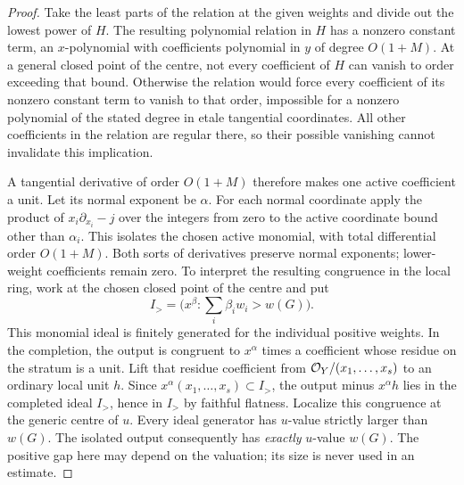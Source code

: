 \begin{proof}
Take the least parts of the relation at the given weights and divide
out the lowest power of \(H\). The resulting polynomial relation in
\(H\) has a nonzero constant term, an \(x\)-polynomial with coefficients
polynomial in \(y\) of degree \(O(1+M)\). At a general closed point of
the centre, not every coefficient of \(H\) can vanish to order exceeding
that bound. Otherwise the relation would force every coefficient of
its nonzero constant term to vanish to that order, impossible for a
nonzero polynomial of the stated degree in etale tangential coordinates.
All other coefficients in the relation are regular there, so their
possible vanishing cannot invalidate this implication.

A tangential derivative of order \(O(1+M)\) therefore makes one active
coefficient a unit. Let its normal exponent be \(\alpha\). For each
normal coordinate apply the product of
\(x_i\partial_{x_i}-j\) over the integers from zero to the active
coordinate bound other than \(\alpha_i\).
This isolates the chosen active monomial, with total differential order
\(O(1+M)\). Both sorts of derivatives preserve normal exponents;
lower-weight coefficients remain zero. To interpret the resulting
congruence in the local ring, work at the chosen closed point of the
centre and put
\[
 I_{>}=\bigl(x^\beta:\textstyle\sum_i\beta_iw_i>w(G)\bigr).
\]
This monomial ideal is finitely generated for the individual positive
weights. In the completion, the output is congruent to \(x^\alpha\)
times a coefficient whose residue on the stratum is a unit. Lift that
residue coefficient from \(\mathcal O_Y/(x_1,\ldots,x_s)\) to an ordinary
local unit \(h\). Since \(x^\alpha(x_1,\ldots,x_s)\subset I_{>}\),
the output minus \(x^\alpha h\) lies in the completed ideal
\(I_{>}\), hence in \(I_{>}\) by faithful flatness. Localize this
congruence at the generic centre of \(u\).
Every ideal generator has \(u\)-value strictly larger than \(w(G)\).
The isolated output consequently has \emph{exactly} \(u\)-value \(w(G)\).
The positive gap here may depend on the valuation; its size is never
used in an estimate.


\end{proof}
